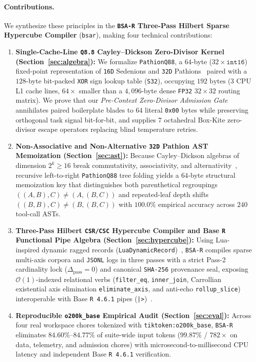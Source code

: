 \documentclass[11pt]{article}
\theoremstyle{plain}
\theoremstyle{definition}
\begin{document}
\paragraph{Contributions.} We synthesize these principles in the \textbf{\texttt{BSA-R} Three-Pass Hilbert Sparse Hypercube Compiler} (\texttt{bsar}), making four technical contributions:
\begin{enumerate}
  \item \textbf{Single-Cache-Line \texttt{Q8.8} Cayley--Dickson Zero-Divisor Kernel (Section~\ref{sec:algebra}):} We formalize \texttt{PathionQ88}, a $64$-byte ($32 \times \mathtt{int16}$) fixed-point representation of \texttt{16D} Sedenions and \texttt{32D} Pathions~\cite{dickson1919,schafer1954,moreno1998,demarrais2000,demarrais2002} paired with a $128$-byte bit-packed \texttt{XOR} sign lookup table (\texttt{S32}), occupying $192\text{ bytes}$ ($3$ CPU L1 cache lines, $64\times$ smaller than a $4{,}096$-byte dense \texttt{FP32} $32\times 32$ routing matrix). We prove that our \emph{Pre-Context Zero-Divisor Admission Gate} annihilates paired boilerplate blades to $64$ literal \texttt{0x00} bytes while preserving orthogonal task signal bit-for-bit, and supplies $7$ octahedral Box-Kite zero-divisor escape operators replacing blind temperature retries.
  \item \textbf{Non-Associative and Non-Alternative \texttt{32D} Pathion AST Memoization (Section~\ref{sec:ast}):} Because Cayley--Dickson algebras of dimension $2^k \ge 16$ break commutativity, associativity, and alternativity~\cite{schafer1954}, recursive left-to-right \texttt{PathionQ88} tree folding yields a $64$-byte structural memoization key that distinguishes both parenthetical regroupings $((A, B), C) \neq (A, (B, C))$ and repeated-leaf depth shifts $((B, B), C) \neq (B, (B, C))$ with $100.0\%$ empirical accuracy across $240$ tool-call ASTs.
  \item \textbf{Three-Pass Hilbert \texttt{CSR/CSC} Hypercube Compiler and Base \texttt{R} Functional Pipe Algebra (Section~\ref{sec:hypercube}):} Using Lua-inspired dynamic ragged records (\texttt{LuaDynamicRecord})~\cite{ierusalimschy1996lua}, \texttt{BSA-R} compiles sparse multi-axis corpora and \texttt{JSONL} logs in three passes with a strict Pass-2 cardinality lock ($\Delta_{\mathrm{pass}} = 0$) and canonical \texttt{SHA-256} provenance seal, exposing $\mathcal{O}(1)$-indexed relational verbs (\texttt{filter\_eq}, \texttt{inner\_join}, Carrollian existential axis elimination \texttt{eliminate\_axis}, and anti-echo \texttt{rollup\_slice}) interoperable with Base \texttt{R 4.6.1} pipes (\texttt{|>})~\cite{ihaka1996r,wickham2019tidyverse}.
  \item \textbf{Reproducible \texttt{o200k\_base} Empirical Audit (Section~\ref{sec:eval}):} Across four real workspace chores tokenized with \texttt{tiktoken:o200k\_base}, \texttt{BSA-R} eliminates $84.60\%$--$84.77\%$ of suite-wide input tokens ($99.87\%$ / $782\times$ on data, telemetry, and admission chores) with microsecond-to-millisecond CPU latency and independent Base \texttt{R 4.6.1} verification.
\end{enumerate}
\end{document}
